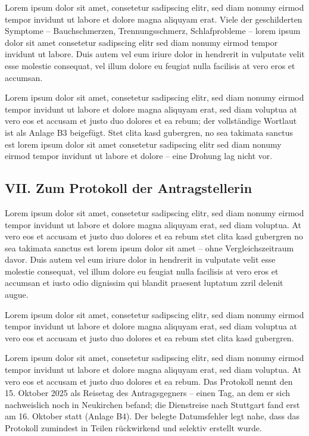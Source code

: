 \documentclass[
  11pt,
  a4paper,
]{article}
\begin{document}
Lorem ipsum dolor sit amet, consetetur sadipscing elitr, sed diam nonumy
eirmod tempor invidunt ut labore et dolore magna aliquyam erat. Viele
der geschilderten Symptome -- Bauchschmerzen, Trennungsschmerz,
Schlafprobleme -- lorem ipsum dolor sit amet consetetur sadipscing elitr
sed diam nonumy eirmod tempor invidunt ut labore. Duis autem vel eum
iriure dolor in hendrerit in vulputate velit esse molestie consequat,
vel illum dolore eu feugiat nulla facilisis at vero eros et accumsan.

Lorem ipsum dolor sit amet, consetetur sadipscing elitr, sed diam nonumy
eirmod tempor invidunt ut labore et dolore magna aliquyam erat, sed diam
voluptua at vero eos et accusam et justo duo dolores et ea rebum; der
vollständige Wortlaut ist als Anlage B3 beigefügt. Stet clita kasd
gubergren, no sea takimata sanctus est lorem ipsum dolor sit amet
consetetur sadipscing elitr sed diam nonumy eirmod tempor invidunt ut
labore et dolore -- eine Drohung lag nicht vor.

\subsection{VII. Zum Protokoll der
Antragstellerin}\label{vii.-zum-protokoll-der-antragstellerin}

Lorem ipsum dolor sit amet, consetetur sadipscing elitr, sed diam nonumy
eirmod tempor invidunt ut labore et dolore magna aliquyam erat, sed diam
voluptua. At vero eos et accusam et justo duo dolores et ea rebum stet
clita kasd gubergren no sea takimata sanctus est lorem ipsum dolor sit
amet -- ohne Vergleichszeitraum davor. Duis autem vel eum iriure dolor
in hendrerit in vulputate velit esse molestie consequat, vel illum
dolore eu feugiat nulla facilisis at vero eros et accumsan et iusto odio
dignissim qui blandit praesent luptatum zzril delenit augue.

Lorem ipsum dolor sit amet, consetetur sadipscing elitr, sed diam nonumy
eirmod tempor invidunt ut labore et dolore magna aliquyam erat, sed diam
voluptua at vero eos et accusam et justo duo dolores et ea rebum stet
clita kasd gubergren.

Lorem ipsum dolor sit amet, consetetur sadipscing elitr, sed diam nonumy
eirmod tempor invidunt ut labore et dolore magna aliquyam erat, sed diam
voluptua. At vero eos et accusam et justo duo dolores et ea rebum. Das
Protokoll nennt den 15. Oktober 2025 als Reisetag des Antragsgegners --
einen Tag, an dem er sich nachweislich noch in Neukirchen befand; die
Dienstreise nach Stuttgart fand erst am 16. Oktober statt (Anlage B4).
Der belegte Datumsfehler legt nahe, dass das Protokoll zumindest in
Teilen rückwirkend und selektiv erstellt wurde.
\end{document}
